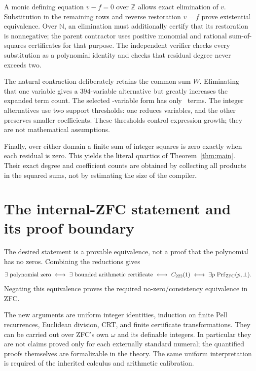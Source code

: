 \documentclass[10pt,letterpaper]{article}
\theoremstyle{remark}\newtheorem{remark}[theorem]{Remark}
\newcommand{\N}{\mathbb N}\newcommand{\Z}{\mathbb Z}
\newcommand{\ZFC}{\mathrm{ZFC}}\newcommand{\ZF}{\mathrm{ZF}}
\begin{document}
A monic defining equation $v-f=0$ over $\Z$ allows exact elimination
of $v$. Substitution in the remaining rows and reverse restoration
$v=f$ prove existential equivalence. Over $\N$, an elimination must
additionally certify that its restoration is nonnegative; the parent
contractor uses positive monomial and rational sum-of-squares
certificates for that purpose. The independent verifier checks every
substitution as a polynomial identity and checks that residual degree
never exceeds two.

The natural contraction deliberately retains the common sum $W$.
Eliminating that one variable gives a 394-variable alternative but
greatly increases the expanded term count. The selected \nvars-variable
form has only \nterms\ terms. The integer alternatives use two support
thresholds: one reduces variables, and the other preserves smaller
coefficients. These thresholds control expression growth; they are not
mathematical assumptions.

Finally, over either domain a finite sum of integer squares is zero
exactly when each residual is zero. This yields the literal quartics
of Theorem~\ref{thm:main}. Their exact degree and coefficient counts
are obtained by collecting all products in the squared sums, not by
estimating the size of the compiler.

\section{The internal-ZFC statement and its proof boundary}
\label{sec:internal}

The desired statement is a provable equivalence, not a proof that the
polynomial has no zeros. Combining the reductions gives
\[
 \exists\hbox{ polynomial zero}
 \ \longleftrightarrow\
 \exists\hbox{ bounded arithmetic certificate}
 \ \longleftrightarrow\
 C_{222}(1)
 \ \longleftrightarrow\
 \exists p\,\Prf_{\ZFC}(p,\bot).
\]
Negating this equivalence proves the required no-zero/consistency
equivalence in ZFC.

The new arguments are uniform integer identities, induction on finite
Pell recurrences, Euclidean division, CRT, and finite certificate
transformations. They can be carried out over ZFC's own $\omega$ and
its definable integers. In particular they are not claims proved only
for each externally standard numeral; the quantified proofs themselves
are formalizable in the theory. The same uniform interpretation is
required of the inherited calculus and arithmetic calibration.
\end{document}
